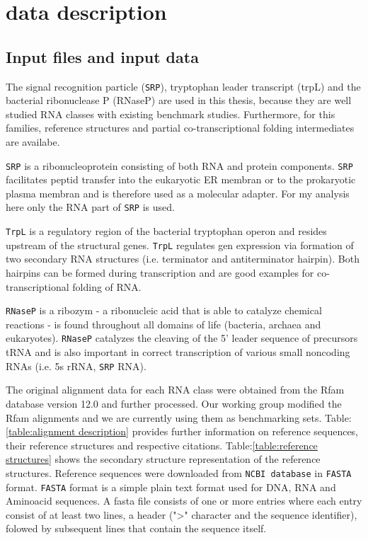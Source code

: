 \documentclass[ twoside,openright,titlepage,numbers=noenddot,headinclude,%
                footinclude=false, cleardoublepage=empty,abstractoff, %
                BCOR=5mm,paper=a4,fontsize=11pt,%
                ngerman,american,%
                ]{scrreprt}
\begin{document}
\section{data description} \label{data description}

\subsection{Input files and input data}


The signal recognition particle (\texttt{SRP})\cite{SRP}, tryptophan leader
transcript (trpL)\cite{sourceRefTRP} and the bacterial ribonuclease P
(RNaseP)\cite{RNAseP} are used in this thesis, because they are well studied RNA classes with existing benchmark studies. Furthermore, for this families, reference structures and partial co-transcriptional folding intermediates are availabe.

\texttt{SRP} is a ribonucleoprotein consisting of both RNA and protein
components. \texttt{SRP} facilitates peptid transfer into the eukaryotic ER membran
or to the prokaryotic plasma membran and is therefore used as a molecular
adapter. For my analysis here only the RNA part of \texttt{SRP} is used.

  
\texttt{TrpL} is a regulatory region of the bacterial tryptophan operon and resides
upstream of the structural genes.
\texttt{TrpL} regulates gen expression via formation of two secondary RNA structures (i.e. terminator and antiterminator hairpin). Both hairpins can be formed during transcription and are good examples for co-transcriptional folding of RNA. 


\texttt{RNaseP} is a ribozym - a ribonucleic acid that is able to catalyze chemical
reactions - is found throughout all domains of life (bacteria, archaea and
eukaryotes). \texttt{RNaseP} catalyzes the cleaving of the 5' leader sequence of precursors tRNA and is also important in correct transcription of various small noncoding RNAs (i.e. 5s rRNA, \texttt{SRP} RNA). 



The original alignment data for each RNA class were obtained from the
Rfam\cite{Rfam} database version 12.0 and further processed\cite{Meyer}. Our working
group modified the Rfam alignments and we are currently using them as
benchmarking sets. 
Table:\ref{table:alignment description} provides further information on
reference sequences, their reference structures and respective
citations. Table:\ref{table:reference structures} shows the secondary structure representation of the reference structures. Reference sequences were downloaded from \texttt{NCBI database} in \texttt{FASTA} format. 
\texttt{FASTA} format is a simple plain text format used for DNA, RNA and
Aminoacid sequences. A fasta file consists of one or more entries where
each entry consist of at least two lines, a header (">" character and the sequence
identifier), folowed by subsequent lines that contain the sequence itself.
\end{document}

